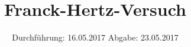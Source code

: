 

\subject{V601}
\title{Franck-Hertz-Versuch}
\date{
\centering
  Durchführung: 16.05.2017
  \hspace{3em}
  Abgabe: 23.05.2017
}



\maketitle
\thispagestyle{empty}
\tableofcontents
\newpage



%




\printbibliography


